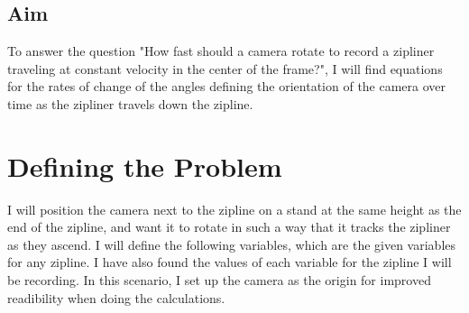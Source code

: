\documentclass[12pt]{article}
\begin{document}
\subsection{Aim}
To answer the question "How fast should a camera rotate to record a zipliner traveling at constant velocity in the center of the frame?", I will find equations for the rates of change of the angles defining the orientation of the camera over time as the zipliner travels down the zipline. 

\section{Defining the Problem}

I will position the camera next to the zipline on a stand at the same height as the end of the zipline, and want it to rotate in such a way that it tracks the zipliner as they ascend. I will define the following variables, which are the given variables for any zipline. I have also found the values of each variable for the zipline I will be recording. In this scenario, I set up the camera as the origin for improved readibility when doing the calculations.

\end{document}
